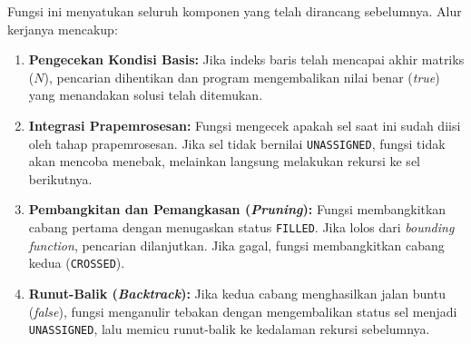 \documentclass[conference]{IEEEtran}
\begin{document}
Fungsi ini menyatukan seluruh komponen yang telah dirancang sebelumnya. Alur kerjanya mencakup:
\begin{enumerate}
    \item \textbf{Pengecekan Kondisi Basis:} Jika indeks baris telah mencapai akhir matriks ($N$), pencarian dihentikan dan program mengembalikan nilai benar (\textit{true}) yang menandakan solusi telah ditemukan.
    \item \textbf{Integrasi Prapemrosesan:} Fungsi mengecek apakah sel saat ini sudah diisi oleh tahap prapemrosesan. Jika sel tidak bernilai \texttt{UNASSIGNED}, fungsi tidak akan mencoba menebak, melainkan langsung melakukan rekursi ke sel berikutnya.
    \item \textbf{Pembangkitan dan Pemangkasan (\textit{Pruning}):} Fungsi membangkitkan cabang pertama dengan menugaskan status \texttt{FILLED}. Jika lolos dari \textit{bounding function}, pencarian dilanjutkan. Jika gagal, fungsi membangkitkan cabang kedua (\texttt{CROSSED}).
    \item \textbf{Runut-Balik (\textit{Backtrack}):} Jika kedua cabang menghasilkan jalan buntu (\textit{false}), fungsi menganulir tebakan dengan mengembalikan status sel menjadi \texttt{UNASSIGNED}, lalu memicu runut-balik ke kedalaman rekursi sebelumnya.
\end{enumerate}
\end{document}
